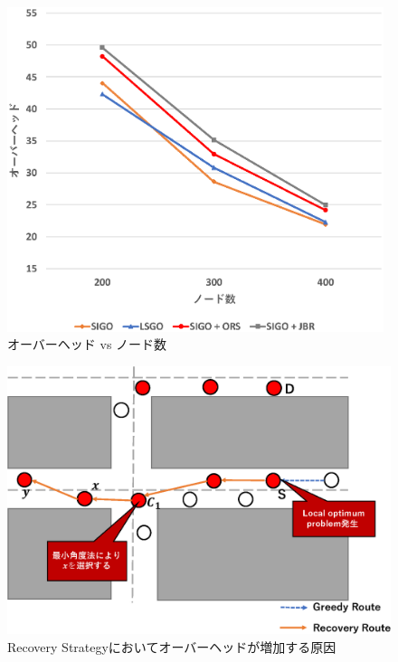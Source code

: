 \documentclass[10pt]{jreport}
\begin{document}
\begin{figure}[!ht]
	\centering
	\includegraphics[width=110mm]{figures/SIGO_overhead_num.eps}
	\caption{オーバーヘッド vs ノード数}
	\label{fig:SIGO_overhead}
\end{figure}

\begin{figure}[!ht]
	\centering
	\includegraphics[width=120mm]{figures/Recovery_overhead_reason.eps}
	\caption{Recovery Strategyにおいてオーバーヘッドが増加する原因}
	\label{fig:Recocvery_overhead_reason}
\end{figure}
\end{document}
